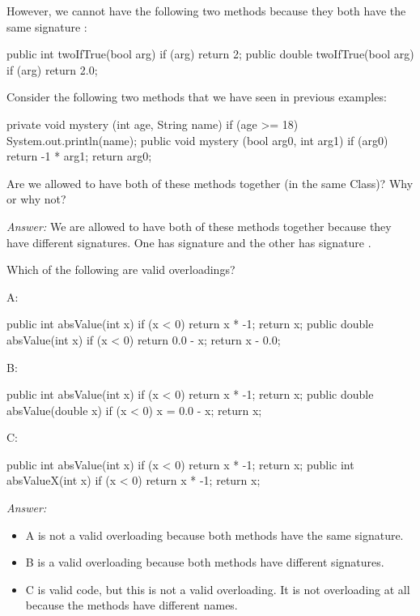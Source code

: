 However, we cannot have the following two methods because they both have the
same signature :
\begin{code}
public int twoIfTrue(bool arg) {
  if (arg) {
    return 2;
  }
}
public double twoIfTrue(bool arg) {
  if (arg) {
    return 2.0;
  }
}
\end{code}

\begin{example}
Consider the following two methods that we have seen in previous
examples:
\begin{code}
private void mystery (int age, String name) {
  if (age >= 18) {
    System.out.println(name);
  }
}
public void mystery (bool arg0, int arg1) {
  if (arg0) {
    return -1 * arg1;
  }
  return arg0;
}
\end{code}
Are we allowed to have both of these methods together (in the same Class)?
Why or why not?

\noindent \emph{Answer:}
We are allowed to have both of these methods together because they have
different signatures. One has signature 
and the other has signature .
\end{example}

\begin{example}
Which of the following are valid overloadings?

\noindent A:
\begin{code}
public int absValue(int x) {
  if (x < 0) {
    return x * -1;
  }
  return x;
}
public double absValue(int x) {
  if (x < 0) {
    return 0.0 - x;
  }
  return x - 0.0;
}
\end{code}

\noindent B:
\begin{code}
public int absValue(int x) {
  if (x < 0) {
    return x * -1;
  }
  return x;
}
public double absValue(double x) {
  if (x < 0) {
    x = 0.0 - x;
  }
  return x;
}
\end{code}

\noindent C:
\begin{code}
public int absValue(int x) {
  if (x < 0) {
    return x * -1;
  }
  return x;
}
public int absValueX(int x) {
  if (x < 0) {
    return x * -1;
  }
  return x;
}
\end{code}

\noindent \emph{Answer:}
\begin{itemize}
\item A is not a valid overloading because both methods have the same signature.
\item B is a valid overloading because both methods have different signatures.
\item C is valid code, but this is not a valid overloading. It is not overloading at all because the methods have different names.
\end{itemize}
\end{example}

